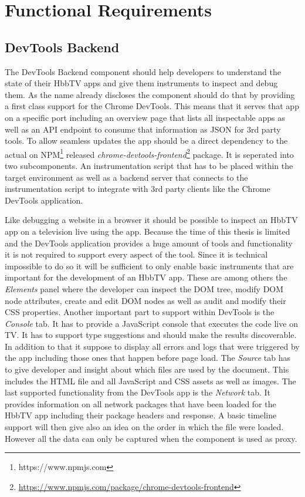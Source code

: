 \section{Functional Requirements\label{sec:reqsuba}}

\subsection{DevTools Backend}

The DevTools Backend component should help developers to understand the state of their HbbTV
apps and give them instruments to inspect and debug them. As the name already discloses
the component should do that by providing a first class support for the Chrome DevTools.
This means that it serves that app on a specific port including an overview page that lists
all inspectable apps as well as an API endpoint to consume that information as JSON for
3rd party tools. To allow seamless updates the app should be a direct dependency to the actual
on NPM\footnote{https://www.npmjs.com} released \textit{chrome-devtools-frontend}\footnote{\url{https://www.npmjs.com/package/chrome-devtools-frontend}}
package. It is seperated into two subcomponents. An instrumentation script that has to be
placed within the target environment as well as a backend server that connects to the
instrumentation script to integrate with 3rd party clients like the Chrome DevTools application.

Like debugging a website in a browser it should be possible to inspect an HbbTV app on a
television live using the app. Because the time of this thesis is limited and the DevTools
application provides a huge amount of tools and functionality it is not required to support
every aspect of the tool. Since it is technical impossible to do so it will be sufficient to
only enable basic instruments that are important for the development of an HbbTV app. These
are among others the \textit{Elements} panel where the developer can inspect the DOM tree,
modify DOM node attributes, create and edit DOM nodes as well as audit and modify their
CSS properties. Another important part to support within DevTools is the \textit{Console}
tab. It has to provide a JavaScript console that executes the code live on TV. It has to
support type suggestions and should make the results discoverable. In addition to that it
suppose to display all errors and logs that were triggered by the app including those ones
that happen before page load. The \textit{Source} tab has to give developer and insight
about which files are used by the document. This includes the HTML file and all JavaScript
and CSS assets as well as images. The last supported functionality from the DevTools app is
the \textit{Network} tab. It provides information on all network packages that have been
loaded for the HbbTV app including their package headers and response. A basic timeline support
will then give also an idea on the order in which the file were loaded. However all the data
can only be captured when the component is used as proxy.

